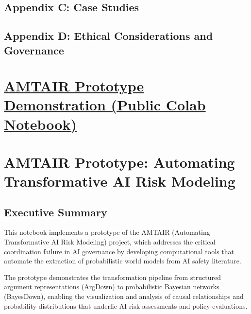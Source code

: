 \documentclass[
  11pt,
  letterpaper,
]{book}
\begin{document}

\section*{Appendix C: Case Studies}\label{sec-appendix-case-studies}


\section*{Appendix D: Ethical Considerations and
Governance}\label{sec-appendix-ethical}


\chapter{\texorpdfstring{\href{https://colab.research.google.com/github/SingularitySmith/AMTAIR_Prototype/blob/main/version_history/AMTAIR_Prototype_0_1.3.ipynb\#scrollTo=lt8-AnebGUXr}{AMTAIR
Prototype Demonstration (Public Colab
Notebook)}}{AMTAIR Prototype Demonstration (Public Colab Notebook)}}\label{amtair-prototype-demonstration-public-colab-notebook}

\chapter{AMTAIR Prototype: Automating Transformative AI Risk
Modeling}\label{amtair-prototype-automating-transformative-ai-risk-modeling}

\section{Executive Summary}\label{executive-summary}

This notebook implements a prototype of the AMTAIR (Automating
Transformative AI Risk Modeling) project, which addresses the critical
coordination failure in AI governance by developing computational tools
that automate the extraction of probabilistic world models from AI
safety literature.

The prototype demonstrates the transformation pipeline from structured
argument representations (ArgDown) to probabilistic Bayesian networks
(BayesDown), enabling the visualization and analysis of causal
relationships and probability distributions that underlie AI risk
assessments and policy evaluations.
\end{document}
